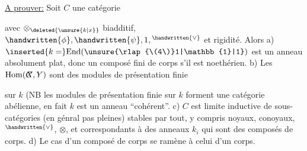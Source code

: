 \uline{A prouver:} Soit $C$ une catégorie  avec $\otimes_{\deleted{\unsure{k|x}}}$ biadditif, $\handwritten{\phi},\handwritten{\psi},1,{}^{\handwritten{\vee}}$ et rigidité. Alors a) $\inserted{k=}\mathrm{End}(\unsure{\rlap{\(4\)}1|\mathbb{1}|1})$ est un anneau absolument plat, donc un composé fini de  corps s'il est noethérien. b) Les $\mathrm{Hom}(\rlap{\(C\)}X,Y)$ sont des modules de présentation finie  \rlap{(}sur $k$ (NB les modules de présentation finie sur $k$ forment une catégorie abélienne, en fait $k$ est un anneau ``cohérent''\unsure{\rlap{,})|)}. c)  $C$ est limite inductive de sous-catégories (en génral pas pleines) stables par tout, y compris noyaux, conoyaux, ${}^{\handwritten{\vee}}$, $\otimes$, et correspondants à des anneaux $k_{i}$ qui sont des  composés de corps. d) Le cas d'un composé de corps se ramène à celui d'un corps.

